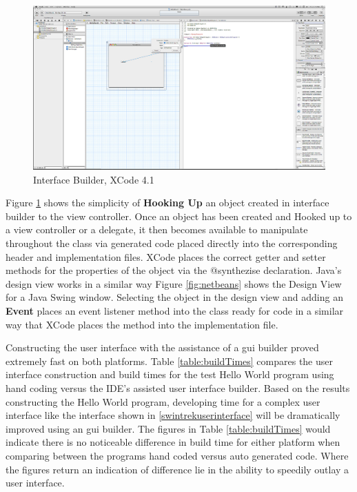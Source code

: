 \documentclass[a4paper,14pt]{article}
\begin{document}
\begin{figure}[H]
\centering
\includegraphics[scale=0.17]{HelloWorldLabelHookUp.eps}
\caption{Interface Builder, XCode 4.1}
\label{fig:interfaceBuilder}
\end{figure}

Figure \ref{fig:interfaceBuilder} shows the simplicity of \textbf{Hooking Up} an object created in interface builder to the view controller. Once an object has been created and Hooked up to a view controller or a delegate, it then becomes available to manipulate throughout the class via generated code placed directly into the corresponding header and implementation files. XCode places the correct getter and setter methods for the properties of the object via the @synthezise declaration. Java's design view works in a similar way Figure \ref{fig:netbeans} shows the Design View for a Java Swing window. Selecting the object in the design view and adding an \textbf{Event} places an event listener method into the class ready for code in a similar way that XCode places the method into the implementation file. 

Constructing the user interface with the assistance of a \gls{gui} builder proved extremely fast on both platforms. Table \ref{table:buildTimes} compares the user interface construction and build times for the test Hello World program using hand coding versus the IDE's assisted user interface builder. Based on the results constructing the Hello World program, developing time for a complex user interface like the interface shown in \ref{swintrekuserinterface} will be dramatically improved using an \gls{gui} builder. The figures in Table \ref{table:buildTimes} would indicate there is no noticeable difference in build time for either platform when comparing between the programs hand coded versus auto generated code. Where the figures return an indication of difference lie in the ability to speedily outlay a user interface.
\end{document}
